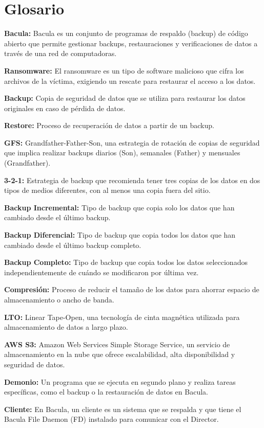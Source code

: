 \documentclass[12pt,a4paper]{article}
\begin{document}
\newpage
{} 
\section{Glosario}
\textbf{Bacula:} Bacula es un conjunto de programas de respaldo (backup) de código abierto que permite gestionar backups, restauraciones y verificaciones de datos a través de una red de computadoras.

\textbf{Ransomware:} El ransomware es un tipo de software malicioso que cifra los archivos de la víctima, exigiendo un rescate para restaurar el acceso a los datos.

\textbf{Backup:} Copia de seguridad de datos que se utiliza para restaurar los datos originales en caso de pérdida de datos.

\textbf{Restore:} Proceso de recuperación de datos a partir de un backup.

\textbf{GFS:} Grandfather-Father-Son, una estrategia de rotación de copias de seguridad que implica realizar backups diarios (Son), semanales (Father) y mensuales (Grandfather).

\textbf{3-2-1:} Estrategia de backup que recomienda tener tres copias de los datos en dos tipos de medios diferentes, con al menos una copia fuera del sitio.

\textbf{Backup Incremental:} Tipo de backup que copia solo los datos que han cambiado desde el último backup.

\textbf{Backup Diferencial:} Tipo de backup que copia todos los datos que han cambiado desde el último backup completo.

\textbf{Backup Completo:} Tipo de backup que copia todos los datos seleccionados independientemente de cuándo se modificaron por última vez.

\textbf{Compresión:} Proceso de reducir el tamaño de los datos para ahorrar espacio de almacenamiento o ancho de banda.

\textbf{LTO:} Linear Tape-Open, una tecnología de cinta magnética utilizada para almacenamiento de datos a largo plazo.

\textbf{AWS S3:} Amazon Web Services Simple Storage Service, un servicio de almacenamiento en la nube que ofrece escalabilidad, alta disponibilidad y seguridad de datos.

\textbf{Demonio:} Un programa que se ejecuta en segundo plano y realiza tareas específicas, como el backup o la restauración de datos en Bacula.

\textbf{Cliente:} En Bacula, un cliente es un sistema que se respalda y que tiene el Bacula File Daemon (FD) instalado para comunicar con el Director.
\end{document}
